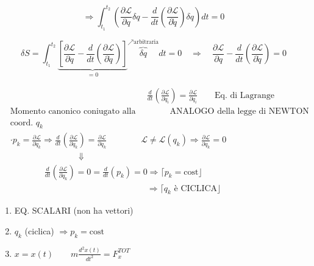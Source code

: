 \documentclass[12pt,a4paper]{article}
\begin{document}
\begin{equation*}
    \Rightarrow \int_{t_1}^{t_2} \left( \frac{\partial \mathcal{L}}{\partial q} \delta q - \frac{d}{dt} \left( \frac{\partial \mathcal{L}}{\partial \dot{q}} \right) \delta q \right) dt = 0
\end{equation*}

\begin{equation*}
    \delta S = \int_{t_1}^{t_2} \underbrace{\left[ \frac{\partial \mathcal{L}}{\partial q} - \frac{d}{dt} \left( \frac{\partial \mathcal{L}}{\partial \dot{q}} \right) \right]}_{= 0} \overbrace{\delta q}^{\nearrow \text{arbitraria}} dt = 0 \quad \Rightarrow \quad \boxed{ \frac{\partial \mathcal{L}}{\partial q} - \frac{d}{dt} \left( \frac{\partial \mathcal{L}}{\partial \dot{q}} \right) = 0 }
\end{equation*}

\vspace{0.5cm}
\begin{align*}
    & \qquad\qquad\qquad\qquad\qquad\qquad\qquad\qquad \frac{d}{dt} \left( \frac{\partial \mathcal{L}}{\partial \dot{q}_i} \right) = \frac{\partial \mathcal{L}}{\partial q_i} \qquad \text{Eq. di Lagrange} \\
    & \text{Momento canonico coniugato alla} \qquad\qquad \text{ANALOGO della legge di NEWTON} \\
    & \text{coord. } q_k \\
    & \cdot p_k = \frac{\partial \mathcal{L}}{\partial \dot{q}_k} \Rightarrow \frac{d}{dt} \left( \frac{\partial \mathcal{L}}{\partial \dot{q}_k} \right) = \frac{\partial \mathcal{L}}{\partial q_k} \qquad\qquad \mathcal{L} \neq \mathcal{L}(q_k) \Rightarrow \frac{\partial \mathcal{L}}{\partial q_k} = 0 \\
    & \qquad\qquad\qquad\qquad \Downarrow \\
    & \qquad\qquad \frac{d}{dt} \left( \frac{\partial \mathcal{L}}{\partial \dot{q}_k} \right) = 0 = \frac{d}{dt} (p_k) = 0 \Rightarrow \lceil p_k = \text{cost} \rfloor \\
    & \qquad\qquad\qquad\qquad\qquad\qquad\qquad\qquad \Rightarrow \lceil q_k \text{ è CICLICA} \rfloor
\end{align*}

\begin{enumerate}
    \item EQ. SCALARI (non ha vettori)
    \item $q_k$ (ciclica) $\Rightarrow p_k = \text{cost}$
    \item $x = x(t) \qquad m \frac{d^2 x(t)}{dt^2} = F_x^{TOT}$
\end{enumerate}
\end{document}
